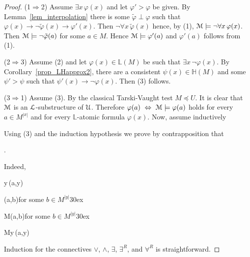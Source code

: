 \documentclass[11pt,oneside]{amsart}
\begin{document}
\begin{proof}
  (1$\Rightarrow$2) Assume $\exists x\,\varphi(x)$ and let $\varphi'>\varphi$ be given.
  By Lemma~\ref{lem_interpolation} there is some $\tilde{\varphi}\perp\varphi$ such that  $\varphi(x)\rightarrow\neg\tilde{\varphi}(x)\rightarrow\varphi'(x)$.
  Then $\neg\forall x\,\tilde{\varphi}(x)$ hence, by (1), ${\EuScript M}\models\neg\forall x\,\varphi(x)$.
  Then ${\EuScript M}\models\neg\tilde{\varphi}(a)$ for some $a\in M$. Hence ${\EuScript M}\models\varphi'(a)$ and $\varphi'(a)$ follows from (1).

  (2$\Rightarrow$3)
  Assume (2) and let $\varphi(x)\in\mathds{L}(M)$ be such that $\exists x\,\neg\varphi(x)$.
  By Corollary~\ref{prop_LHapprox2}, there are a consistent $\psi(x)\in\mathds{H}(M)$ and some $\psi'>\psi$ such that $\psi'(x)\rightarrow\neg\varphi(x)$.
  Then (3) follows.

  (3$\Rightarrow$1)
  Assume (3).
  By the classical Tarski-Vaught test $M\preceq U$.
  It is clear that  ${\EuScript M}$ is an ${\EuScript L}$-sub\-structure of ${\EuScript U}$.
  Therefore  $\varphi(a)\ \Leftrightarrow\ {\EuScript M}\models\varphi(a)$ holds for every $a\in M^{|x|}$ and for every $\mathds{L}$-atomic formula $\varphi(x)$.
  Now, assume inductively
  

  Using (3) and the induction hypothesis we prove by contrapposition that

  .

  Indeed,

  {\Rightarrow}{\exists y\,\neg\varphi(a,y)}
  
  \ceq{}
  {\Rightarrow}
  {\neg\varphi(a,b)}\hfill for some $b\in M^{|y|}$\kern30ex

  \ceq{}
  {\Rightarrow}
  {{\EuScript M}\models\neg\varphi(a,b)}\hfill for some $b\in M^{|y|}$\kern30ex

  \ceq{}
  {\Rightarrow}
  {{\EuScript M}\not\models\forall y\,\varphi(a,y)}

  Induction for the connectives $\vee$, $\wedge$, $\exists$, $\exists^R$, and $\forall^R$ is straightforward.
\end{proof}

\end{document}
